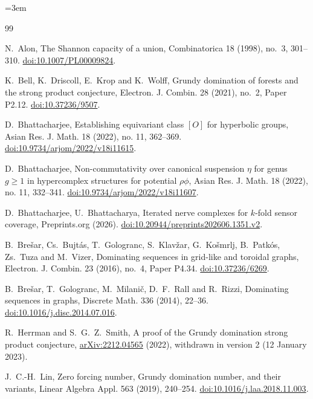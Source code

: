 \documentclass[11pt,a4paper,reqno]{amsart}
\theoremstyle{definition}
\theoremstyle{remark}
\numberwithin{equation}{section}
\begin{document}
\begingroup\sloppy\emergencystretch=3em
\begin{thebibliography}{99}

N.~Alon, The Shannon capacity of a union, Combinatorica 18 (1998), no.~3, 301--310. \href{https://doi.org/10.1007/PL00009824}{doi:10.1007/PL00009824}.

K.~Bell, K.~Driscoll, E.~Krop and K.~Wolff, Grundy domination of forests and the strong product conjecture, Electron. J. Combin. 28 (2021), no.~2, Paper P2.12. \href{https://doi.org/10.37236/9507}{doi:10.37236/9507}.

D.~Bhattacharjee, Establishing equivariant class $[O]$ for hyperbolic groups, Asian Res. J. Math. 18 (2022), no. 11, 362--369. \href{https://doi.org/10.9734/arjom/2022/v18i11615}{doi:10.9734/arjom/2022/v18i11615}.

D.~Bhattacharjee, Non-commutativity over canonical suspension $\eta$ for genus $g\ge1$ in hypercomplex structures for potential $\rho\phi$, Asian Res. J. Math. 18 (2022), no. 11, 332--341. \href{https://doi.org/10.9734/arjom/2022/v18i11607}{doi:10.9734/arjom/2022/v18i11607}.

D.~Bhattacharjee, U.~Bhattacharya, Iterated nerve complexes for $k$-fold sensor coverage, Preprints.org (2026). \href{https://doi.org/10.20944/preprints202606.1351.v2}{doi:10.20944/preprints202606.1351.v2}.

B.~Bre\v{s}ar, Cs.~Bujt\'as, T.~Gologranc, S.~Klav\v{z}ar, G.~Ko\v{s}mrlj, B.~Patk\'os, Zs.~Tuza and M.~Vizer, Dominating sequences in grid-like and toroidal graphs, Electron. J. Combin. 23 (2016), no.~4, Paper P4.34. \href{https://doi.org/10.37236/6269}{doi:10.37236/6269}.

B.~Bre\v{s}ar, T.~Gologranc, M.~Milani\v{c}, D.~F.~Rall and R.~Rizzi, Dominating sequences in graphs, Discrete Math. 336 (2014), 22--36. \href{https://doi.org/10.1016/j.disc.2014.07.016}{doi:10.1016/j.disc.2014.07.016}.

R.~Herrman and S.~G.~Z.~Smith, A proof of the Grundy domination strong product conjecture, \href{https://arxiv.org/abs/2212.04565v2}{arXiv:2212.04565} (2022), withdrawn in version 2 (12 January 2023).

J.~C.-H.~Lin, Zero forcing number, Grundy domination number, and their variants, Linear Algebra Appl. 563 (2019), 240--254. \href{https://doi.org/10.1016/j.laa.2018.11.003}{doi:10.1016/j.laa.2018.11.003}.

\end{thebibliography}
\endgroup
\end{document}

